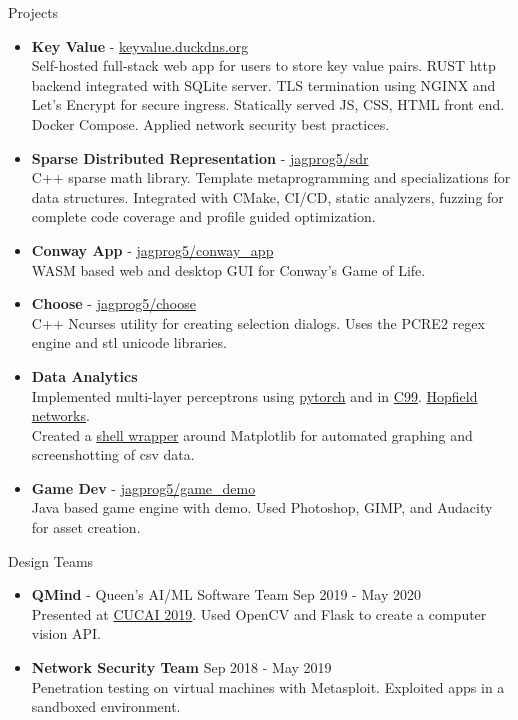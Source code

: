 \documentclass{resume} %
\begin{document}
\begin{rSection}{Projects}
    \begin{itemize}
        \item {\bf Key Value} - \href{https://keyvalue.duckdns.org/}{keyvalue.duckdns.org}\\
        Self-hosted full-stack web app for users to store key value pairs. RUST http backend integrated with SQLite server. TLS termination using NGINX and Let's Encrypt for secure ingress.
        Statically served JS, CSS, HTML front end. Docker Compose. Applied network security best practices.
        \item {\bf Sparse Distributed Representation} - \href{https://github.com/jagprog5/SDR/}{jagprog5/sdr}\\
        C++ sparse math library. Template metaprogramming and specializations for data structures. Integrated with CMake, CI/CD, static analyzers, fuzzing for complete code coverage and profile guided optimization.
        \item {\bf Conway App} - \href{https://github.com/jagprog5/conway_app/}{jagprog5/conway\_app}\\
        WASM based web and desktop GUI for Conway's Game of Life.
        \item {\bf Choose} - \href{https://github.com/jagprog5/choose/}{jagprog5/choose}\\
        C++ Ncurses utility for creating selection dialogs.
        Uses the PCRE2 regex engine and stl unicode libraries.
        \item {\bf Data Analytics}\\
        Implemented multi-layer perceptrons using \href{https://github.com/jagprog5/mlp}{pytorch} and in \href{https://github.com/jagprog5/CNeuralNet}{C99}. \href{https://github.com/jagprog5/hopfield}{Hopfield networks}.\\
        Created a \href{https://github.com/jagprog5/CSV-Plotter}{shell wrapper} around Matplotlib for automated graphing and screenshotting of csv data. 
        \item {\bf Game Dev} - \href{https://github.com/jagprog5/GameDemo}{jagprog5/game\_demo}\\
        Java based game engine with demo. Used Photoshop, GIMP, and Audacity for asset creation.
    \end{itemize}
\end{rSection}

\begin{rSection}{Design Teams}
    \begin{itemize}
        \item {\bf QMind} - Queen's AI/ML Software Team \hfill {Sep 2019 - May 2020}\\
        Presented at \href{https://medium.com/qmind-ai/cucai2019-c9d5f848f5c}{CUCAI 2019}. Used OpenCV and Flask to create a computer vision API.
        \item {\bf Network Security Team} \hfill {Sep 2018 - May 2019}\\
        Penetration testing on virtual machines with Metasploit. Exploited apps in a sandboxed environment.
\end{itemize}
\end{rSection}
\end{document}
